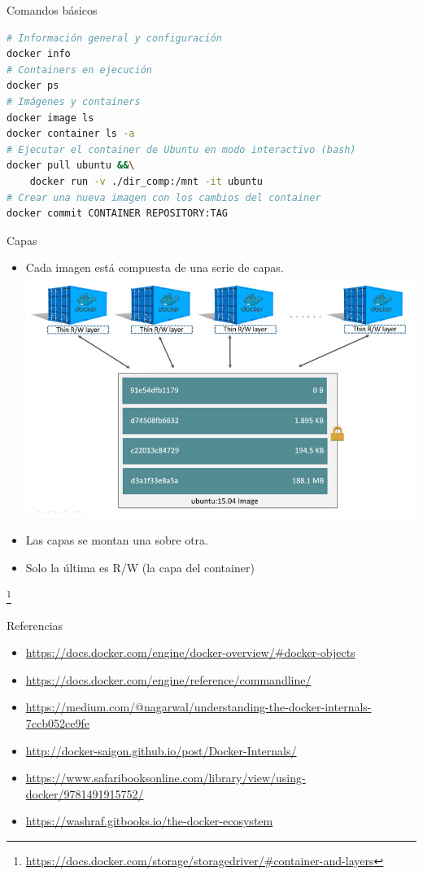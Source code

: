 \begin{frame}[fragile]{Comandos básicos}
    \begin{lstlisting}[language=bash,basicstyle=\normalsize]
# Información general y configuración
docker info
# Containers en ejecución
docker ps
# Imágenes y containers
docker image ls
docker container ls -a
# Ejecutar el container de Ubuntu en modo interactivo (bash)
docker pull ubuntu &&\
    docker run -v ./dir_comp:/mnt -it ubuntu
# Crear una nueva imagen con los cambios del container
docker commit CONTAINER REPOSITORY:TAG
    \end{lstlisting}
\end{frame}

\begin{frame}{Capas}
    \begin{itemize}[<+->]
            \item Cada imagen está compuesta de una serie de capas.
            \includegraphics[width=0.6\linewidth]{imagenes/sharing-layers}
            \item Las capas se montan una sobre otra.
            \item Solo la última es R/W (la capa del container)
    \end{itemize}
    \footnote{\url{https://docs.docker.com/storage/storagedriver/\#container-and-layers}}
\end{frame}

\begin{frame}{Referencias}
  \begin{itemize}
    \item \url{https://docs.docker.com/engine/docker-overview/\#docker-objects}
    \item \url{https://docs.docker.com/engine/reference/commandline/}
    \item \url{https://medium.com/@nagarwal/understanding-the-docker-internals-7ccb052ce9fe}
    \item \url{http://docker-saigon.github.io/post/Docker-Internals/}
    \item \url{https://www.safaribooksonline.com/library/view/using-docker/9781491915752/}
    \item \url{https://washraf.gitbooks.io/the-docker-ecosystem}
  \end{itemize}
\end{frame}



